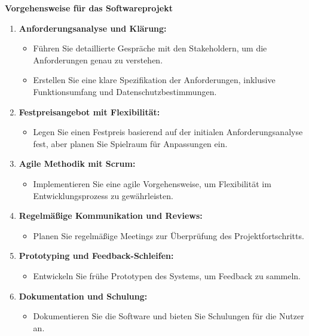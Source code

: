 \documentclass[main.tex]{subfiles}
\begin{document}
   \textbf{Vorgehensweise für das Softwareprojekt}
   \renewcommand{\labelenumi}{\arabic{enumi}.}
   \begin{enumerate}
       \item \textbf{Anforderungsanalyse und Klärung:}
       \begin{itemize}
           \item Führen Sie detaillierte Gespräche mit den Stakeholdern, um die Anforderungen genau zu verstehen.
           \item Erstellen Sie eine klare Spezifikation der Anforderungen, inklusive Funktionsumfang und Datenschutzbestimmungen.
       \end{itemize}

       \item \textbf{Festpreisangebot mit Flexibilität:}
       \begin{itemize}
           \item Legen Sie einen Festpreis basierend auf der initialen Anforderungsanalyse fest, aber planen Sie Spielraum für Anpassungen ein.
       \end{itemize}

       \item \textbf{Agile Methodik mit Scrum:}
       \begin{itemize}
           \item Implementieren Sie eine agile Vorgehensweise, um Flexibilität im Entwicklungsprozess zu gewährleisten.
       \end{itemize}

       \item \textbf{Regelmäßige Kommunikation und Reviews:}
       \begin{itemize}
           \item Planen Sie regelmäßige Meetings zur Überprüfung des Projektfortschritts.
       \end{itemize}

       \item \textbf{Prototyping und Feedback-Schleifen:}
       \begin{itemize}
           \item Entwickeln Sie frühe Prototypen des Systems, um Feedback zu sammeln.
       \end{itemize}

       \item \textbf{Dokumentation und Schulung:}
       \begin{itemize}
           \item Dokumentieren Sie die Software und bieten Sie Schulungen für die Nutzer an.
       \end{itemize}
   \end{enumerate}
\end{document}
